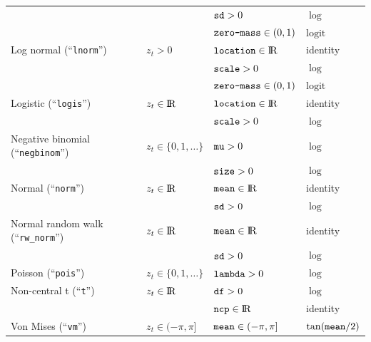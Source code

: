 \documentclass[12pt]{article}\usepackage[]{graphicx}\usepackage[]{color}
\begin{document}
\begin{small}
\begin{table}
\begin{tabular}{llll}
  \rowcolor{Gray}                             &                               & $\verb|sd|>0$                                   &  $\log$ \tabularnewline  
  \rowcolor{Gray}                             &                               & $\verb|zero-mass|\in(0,1)$                      &  $\text{logit}$ \tabularnewline 
  Log normal (``\verb|lnorm|'')               & $z_t>0$                       & $\verb|location|\in{\rm I\!R}$                  &  identity \tabularnewline  
                                              &                               & $\verb|scale|>0$                                &  $\log$ \tabularnewline  
                                              &                               & $\verb|zero-mass|\in(0,1)$                      &  $\text{logit}$ \tabularnewline 
  \rowcolor{Gray} Logistic (``\verb|logis|'') & $z_t\in{\rm I\!R}$            & $\verb|location|\in{\rm I\!R}$                  &  identity \tabularnewline  
  \rowcolor{Gray}                             &                               & $\verb|scale|>0$                                &  $\log$ \tabularnewline                
  Negative binomial (``\verb|negbinom|'')     & $z_t\in\{0,1,\ldots\}$        & $\verb|mu|>0$                                   &  $\log$ \tabularnewline  
                                              &                               & $\verb|size|>0$                                 &  $\log$ \tabularnewline  
  \rowcolor{Gray} Normal (``\verb|norm|'')    & $z_t\in{\rm I\!R}$            & $\verb|mean|\in{\rm I\!R}$                      &  identity \tabularnewline  
  \rowcolor{Gray}                             &                               & $\verb|sd|>0$                                   &  $\log$ \tabularnewline 
  Normal random walk (``\verb|rw_norm|'')     & $z_t\in{\rm I\!R}$            & $\verb|mean|\in{\rm I\!R}$                      &  identity \tabularnewline  
                                              &                               & $\verb|sd|>0$                                   &  $\log$ \tabularnewline       
  \rowcolor{Gray} Poisson (``\verb|pois|'')   & $z_t\in\{0,1,\ldots\}$        & $\verb|lambda|>0$                               &  $\log$ \tabularnewline  
  Non-central t (``\verb|t|'')                & $z_t\in{\rm I\!R}$            & $\verb|df|>0$                                   &  $\log$ \tabularnewline  
                                              &                               & $\verb|ncp|\in{\rm I\!R}$                       &  identity \tabularnewline 
  \rowcolor{Gray} Von Mises (``\verb|vm|'')   & $z_t\in(-\pi,\pi]$            & $\verb|mean|\in(-\pi,\pi]$                      &  $\tan(\verb|mean|/2)$ \tabularnewline  

\end{tabular}
\end{table}
\end{small}
\end{document}
